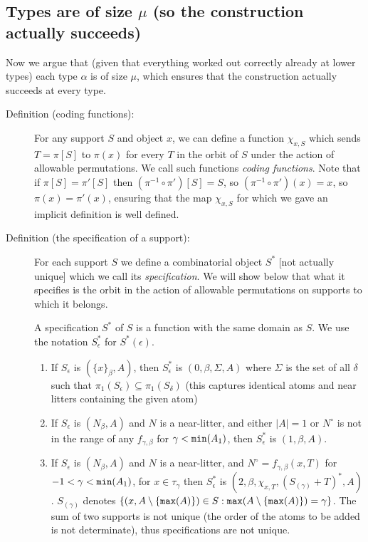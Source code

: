 \documentclass[112pt]{article}
\begin{document}
\newpage
\subsection{Types are of size $\mu$ (so the construction actually succeeds)}

Now we argue that (given that everything worked out correctly already at lower types) each type $\alpha$ is of size $\mu$, which ensures
that the construction actually succeeds at every type.

\begin{description}


\item[Definition (coding functions):]  For any support $S$ and object $x$, we can define a function $\chi_{x,S}$ which sends $T=\pi[S]$ to $\pi(x)$ for every $T$ in the orbit of $S$ under
the action of allowable permutations.  We call such functions {\em coding functions\/}.  Note that if $\pi[S]=\pi'[S]$ then $(\pi^{-1}\circ \pi')[S]= S$, so 
$(\pi^{-1}\circ \pi')(x)= x$, so $\pi(x)=\pi'(x)$, ensuring that the map $\chi_{x,S}$ for which we gave an implicit definition is well defined.

\item[Definition (the specification of a support):]   For each support $S$ we define a combinatorial object $S^*$ [not actually unique]  which we call its {\em specification\/}.  We will show below that what it specifies is the orbit in the action of allowable permutations on supports to which it belongs.

A specification $S^*$ of $S$ is a function with the same domain as $S$.  We use the notation $S^*_\epsilon$ for $S^*(\epsilon)$.

\begin{enumerate}

\item  If $S_{\epsilon}$ is $(\{x\}_\beta,A)$, then $S^*_\epsilon$ is $(0,\beta,\Sigma,A)$ where  $\Sigma$ is the set of all $\delta$ such that $\pi_1(S_\epsilon) \subseteq \pi_1(S_\delta)$ (this captures identical atoms and near litters containing the given atom)

\item  If $S_\epsilon$ is $(N_\beta,A)$ and $N$ is a near-litter, and either $|A|=1$ or $N^\circ$ is not in the range of any $f_{\gamma,\beta}$ for $\gamma<{\tt min}(A_1)$, then $S^*_\epsilon$ is $(1,\beta,A)$.

\item  If $S_\epsilon$ is $(N_\beta,A)$ and $N$ is a near-litter, and $N^\circ=f_{\gamma,\beta}(x,T)$ for $-1<\gamma<{\tt min}(A_1)$, for $x\in \tau_\gamma$ then 
$S^*_\epsilon$ is $(2,\beta,\chi_{x,T},(S_{(\gamma)}+T)^*,A)$.  $S_{(\gamma)}$ denotes $\{(x,A\setminus \{{\tt max}(A)\})\in S:{\tt max}(A \setminus \{{\tt max}(A)\})=\gamma\}$.  The sum of two supports is not unique (the order of the atoms to be added is not determinate), thus specifications are not unique.


\end{enumerate}
\end{description}
\end{document}
